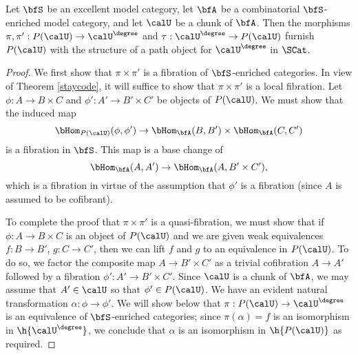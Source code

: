 \begin{Simplicial Categories}
\begin{theorem}\label{catta}
Let $\bfS$ be an excellent model category, let $\bfA$ be a combinatorial $\bfS$-enriched model category, and let $\calU$ be a chunk of $\bfA$. 
Then the morphisms $\pi, \pi': P(\calU) \rightarrow \calU^{\degree}$ and
$\tau: \calU^{\degree} \rightarrow P(\calU)$
furnish $P(\calU)$ with the structure of a path object for
$\calU^{\degree}$ in $\SCat$.
\end{theorem}

\begin{proof}
We first show that $\pi \times \pi'$ is a fibration of $\bfS$-enriched
categories. In view of Theorem \ref{staycode}, it will suffice to show that
$\pi \times \pi'$ is a local fibration. Let $\phi: A \rightarrow B \times C$ and 
$\phi': A' \rightarrow B' \times C'$ be objects of $P(\calU)$.
We must show that the induced map
$$ \bHom_{P(\calU)}(\phi,\phi') \rightarrow \bHom_{\bfA}(B,B') \times
\bHom_{\bfA}(C,C')$$ is a fibration in $\bfS$. 
This map is a base change of 
$$ \bHom_{\bfA}(A,A') \rightarrow \bHom_{\bfA}(A, B' \times C'),$$
which is a fibration in virtue of the assumption that $\phi'$ is a fibration (since
$A$ is assumed to be cofibrant).

To complete the proof that $\pi \times \pi'$ is a quasi-fibration,
we must show that if $\phi: A \rightarrow B \times C$ is an object of
$P( \calU)$ and we are given weak equivalences
$f: B \rightarrow B'$, $g: C \rightarrow C'$, then we can lift
$f$ and $g$ to an equivalence in $P(\calU)$. To do so, we factor the composite map $A \rightarrow B' \times C'$ as a
trivial cofibration $A \rightarrow A'$ followed by a fibration
$\phi': A' \rightarrow B' \times C'$. Since $\calU$ is a chunk of $\bfA$, we may assume that
$A' \in \calU$ so that $\phi' \in P(\calU)$. We have an evident natural transformation
$\alpha: \phi \rightarrow \phi'$. We will show below that $\pi: P(\calU) \rightarrow \calU^{\degree}$
is an equivalence of $\bfS$-enriched categories; since $\pi(\alpha) = f$ is an isomorphism
in $\h{ \calU^{\degree}}$, we conclude that $\alpha$ is an isomorphism in $\h{P(\calU)}$ as
required.


\end{proof}
\end{Simplicial Categories}
